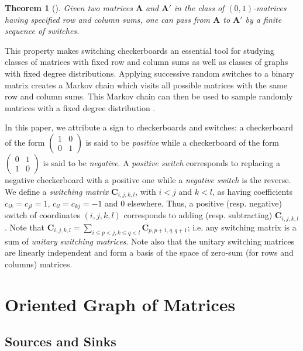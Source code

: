 \documentclass{article}
\newtheorem{theorem}{Theorem}
\newcommand{\A}{\mathbf A}
\newcommand{\C}{\mathbf C}
\begin{document}
\begin{theorem}[\cite{ryser1957}]\label{ryser} Given  two  matrices  $\A$ and  $\A'$ in  the  class  of $(0,  1)$-matrices having specified  row and  column  sums, one can  pass  from  $\A$ to  $\A'$  by  a  finite  sequence  
of switches.
\end{theorem}

This property makes switching checkerboards an essential tool for studying classes of matrices with fixed row and column sums as well as classes of graphs with fixed degree distributions. Applying successive random switches to a binary matrix creates a Markov chain which visits all possible matrices with the same row and column sums. This Markov chain can then be used to sample randomly matrices with a fixed degree distribution \cite{artzy2005generating}. 

In this paper, we attribute a sign to checkerboards and switches: a checkerboard of the form $\begin{pmatrix}
1 & 0 \\
0 & 1
\end{pmatrix}$ is said to be \emph{positive} while a checkerboard of the form $\begin{pmatrix}
0 & 1 \\
1 & 0
\end{pmatrix}$ is said to be \emph{negative}. A \emph{positive switch} corresponds to replacing a negative checkerboard with a positive one while a \emph{negative switch} is the reverse. We define a \emph{switching matrix} $\C_{i,j,k,l}$, with $i<j$ and $k<l$, as having coefficients $c_{ik}=c_{jl}=1$, $c_{il}=c_{kj}=-1$ and 0 elsewhere. Thus, a positive (resp. negative) switch of coordinates $(i,j,k,l)$ corresponds to adding (resp. subtracting) $\C_{i,j,k,l}$. Note that $\C_{i,j,k,l}=\sum_{i\leq p<j,k\leq q<l} \C_{p,p+1,q,q+1}$; i.e. any switching matrix is a sum of \emph{unitary switching matrices}. Note also that the unitary switching matrices are linearly independent and form a basis of the space of zero-sum (for rows and columns) matrices.



\section{Oriented Graph of Matrices}\label{sec:OGM}

\subsection{Sources and Sinks}
\end{document}
